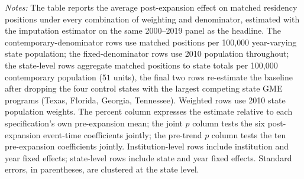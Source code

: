 \begin{landscape}
\begin{table}[H]
\centering
\singlespacing
\begin{threeparttable}
\caption{The Weighting-by-Denominator Specification Grid}
\label{atab:specgrid}

\begin{tablenotes}\footnotesize
\item \textit{Notes:} The table reports the average post-expansion effect on matched residency positions under every combination of weighting and denominator, estimated with the imputation estimator on the same 2000--2019 panel as the headline. The contemporary-denominator rows use matched positions per 100{,}000 year-varying state population; the fixed-denominator rows use 2010 population throughout; the state-level rows aggregate matched positions to state totals per 100{,}000 contemporary population ($51$ units), the final two rows re-estimate the baseline after dropping the four control states with the largest competing state GME programs (Texas, Florida, Georgia, Tennessee). Weighted rows use 2010 state population weights. The percent column expresses the estimate relative to each specification's own pre-expansion mean; the joint $p$ column tests the six post-expansion event-time coefficients jointly; the pre-trend $p$ column tests the ten pre-expansion coefficients jointly. Institution-level rows include institution and year fixed effects; state-level rows include state and year fixed effects. Standard errors, in parentheses, are clustered at the state level.
\end{tablenotes}
\end{threeparttable}
\end{table}
\end{landscape}

